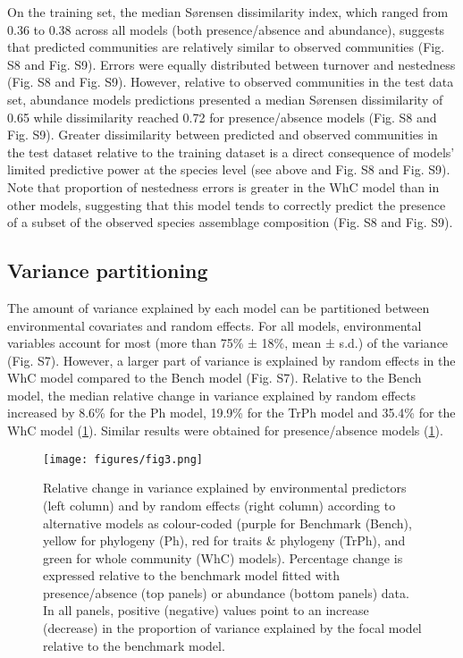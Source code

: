 \documentclass[9pt,biorxiv,doublespacing,lineno]{lapreprint}
\begin{document}
On the training set, the median Sørensen dissimilarity index, which
ranged from 0.36 to 0.38 across all models (both presence/absence and
abundance), suggests that predicted communities are relatively similar
to observed communities (Fig. S8 and Fig. S9). Errors were equally
distributed between turnover and nestedness (Fig. S8 and Fig. S9).
However, relative to observed communities in the test data set,
abundance models predictions presented a median Sørensen dissimilarity
of 0.65 while dissimilarity reached 0.72 for presence/absence models
(Fig. S8 and Fig. S9). Greater dissimilarity between predicted and
observed communities in the test dataset relative to the training
dataset is a direct consequence of models' limited predictive power at
the species level (see above and Fig. S8 and Fig. S9). Note that
proportion of nestedness errors is greater in the WhC model than in
other models, suggesting that this model tends to correctly predict the
presence of a subset of the observed species assemblage composition
(Fig. S8 and Fig. S9).

\hypertarget{variance-partitioning}{%
\subsection{Variance partitioning}\label{variance-partitioning}}

The amount of variance explained by each model can be partitioned
between environmental covariates and random effects. For all models,
environmental variables account for most (more than 75\% ± 18\%, mean ±
s.d.) of the variance (Fig. S7). However, a larger part of variance is
explained by random effects in the WhC model compared to the Bench model
(Fig. S7). Relative to the Bench model, the median relative change in
variance explained by random effects increased by 8.6\% for the Ph
model, 19.9\% for the TrPh model and 35.4\% for the WhC model
(\cref{fig:fig3}). Similar results were obtained for presence/absence
models (\cref{fig:fig3}).

\begin{figure}
\hypertarget{fig:fig3}{%
\centering
\texttt{[image: figures/fig3.png]}
\caption{Relative change in variance explained by environmental
predictors (left column) and by random effects (right column) according
to alternative models as colour-coded (purple for Benchmark (Bench),
yellow for phylogeny (Ph), red for traits \& phylogeny (TrPh), and green
for whole community (WhC) models). Percentage change is expressed
relative to the benchmark model fitted with presence/absence (top
panels) or abundance (bottom panels) data. In all panels, positive
(negative) values point to an increase (decrease) in the proportion of
variance explained by the focal model relative to the benchmark
model.}\label{fig:fig3}
}
\end{figure}
\end{document}
